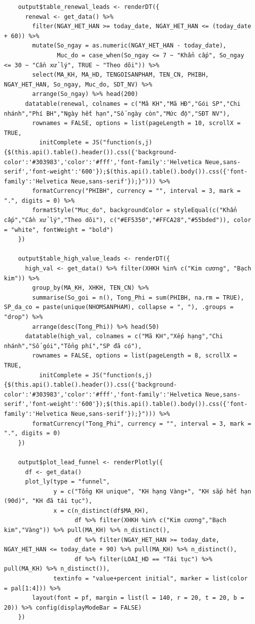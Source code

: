 \documentclass[12pt, a4paper]{article}
\begin{document}
\begin{lstlisting}
    output$table_renewal_leads <- renderDT({
      renewal <- get_data() %>%
        filter(NGAY_HET_HAN >= today_date, NGAY_HET_HAN <= (today_date + 60)) %>%
        mutate(So_ngay = as.numeric(NGAY_HET_HAN - today_date),
               Muc_do = case_when(So_ngay <= 7 ~ "Khẩn cấp", So_ngay <= 30 ~ "Cần xử lý", TRUE ~ "Theo dõi")) %>%
        select(MA_KH, MA_HD, TENGOISANPHAM, TEN_CN, PHIBH, NGAY_HET_HAN, So_ngay, Muc_do, SDT_NV) %>%
        arrange(So_ngay) %>% head(200)
      datatable(renewal, colnames = c("Mã KH","Mã HĐ","Gói SP","Chi nhánh","Phí BH","Ngày hết hạn","Số ngày còn","Mức độ","SĐT NV"),
        rownames = FALSE, options = list(pageLength = 10, scrollX = TRUE,
          initComplete = JS("function(s,j){$(this.api().table().header()).css({'background-color':'#303983','color':'#fff','font-family':'Helvetica Neue,sans-serif','font-weight':'600'});$(this.api().table().body()).css({'font-family':'Helvetica Neue,sans-serif'});}"))) %>%
        formatCurrency("PHIBH", currency = "", interval = 3, mark = ".", digits = 0) %>%
        formatStyle("Muc_do", backgroundColor = styleEqual(c("Khẩn cấp","Cần xử lý","Theo dõi"), c("#EF5350","#FFCA28","#55bded")), color = "white", fontWeight = "bold")
    })

    output$table_high_value_leads <- renderDT({
      high_val <- get_data() %>% filter(XHKH %in% c("Kim cương", "Bạch kim")) %>%
        group_by(MA_KH, XHKH, TEN_CN) %>%
        summarise(So_goi = n(), Tong_Phi = sum(PHIBH, na.rm = TRUE), SP_da_co = paste(unique(NHOMSANPHAM), collapse = ", "), .groups = "drop") %>%
        arrange(desc(Tong_Phi)) %>% head(50)
      datatable(high_val, colnames = c("Mã KH","Xếp hạng","Chi nhánh","Số gói","Tổng phí","SP đã có"),
        rownames = FALSE, options = list(pageLength = 8, scrollX = TRUE,
          initComplete = JS("function(s,j){$(this.api().table().header()).css({'background-color':'#303983','color':'#fff','font-family':'Helvetica Neue,sans-serif','font-weight':'600'});$(this.api().table().body()).css({'font-family':'Helvetica Neue,sans-serif'});}"))) %>%
        formatCurrency("Tong_Phi", currency = "", interval = 3, mark = ".", digits = 0)
    })

    output$plot_lead_funnel <- renderPlotly({
      df <- get_data()
      plot_ly(type = "funnel",
              y = c("Tổng KH unique", "KH hạng Vàng+", "KH sắp hết hạn (90d)", "KH đã tái tục"),
              x = c(n_distinct(df$MA_KH),
                    df %>% filter(XHKH %in% c("Kim cương","Bạch kim","Vàng")) %>% pull(MA_KH) %>% n_distinct(),
                    df %>% filter(NGAY_HET_HAN >= today_date, NGAY_HET_HAN <= today_date + 90) %>% pull(MA_KH) %>% n_distinct(),
                    df %>% filter(LOAI_HD == "Tái tục") %>% pull(MA_KH) %>% n_distinct()),
              textinfo = "value+percent initial", marker = list(color = pal[1:4])) %>%
        layout(font = pf, margin = list(l = 140, r = 20, t = 20, b = 20)) %>% config(displayModeBar = FALSE)
    })


\end{lstlisting}
\end{document}
